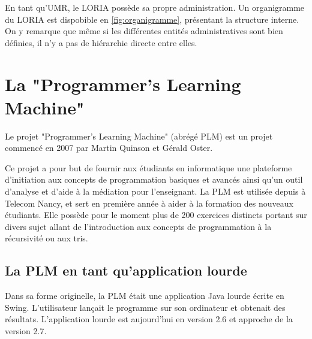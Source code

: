 \documentclass[stage]{tnreport}
\begin{document}
En tant qu'UMR, le LORIA possède sa propre administration. Un organigramme du LORIA est dispobible en \ref{fig:organigramme}\cite{LR-ORG}, présentant la structure interne. On y remarque que même si les différentes entités administratives sont bien définies, il n'y a pas de hiérarchie directe entre elles.


\section{La "Programmer's Learning Machine"}

Le projet "Programmer's Learning Machine" (abrégé PLM) est un projet commencé en 2007 par Martin Quinson et Gérald Oster.

Ce projet a pour but de fournir aux étudiants en informatique une plateforme d'initiation aux concepts de programmation basiques et avancés ainsi qu'un outil d'analyse et d'aide à la médiation pour l'enseignant.
La PLM est utilisée depuis à Telecom Nancy, et sert en première année à aider à la formation des nouveaux étudiants. Elle possède pour le moment plus de 200 exercices distincts portant sur divers sujet allant de l'introduction aux concepts de programmation à la récursivité ou aux tris.

\subsection{La PLM en tant qu'application lourde}

Dans sa forme originelle, la PLM était une application Java lourde écrite en Swing. L'utilisateur lançait le programme sur son ordinateur et obtenait des résultats. L'application lourde est aujourd'hui en version 2.6 et approche de la version 2.7.
\end{document}
